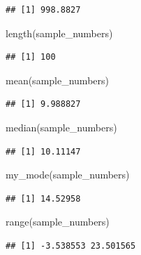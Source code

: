 \documentclass[
]{book}
\newenvironment{Shaded}{\begin{snugshade}}{\end{snugshade}}
\newcommand{\FunctionTok}[1]{\textcolor[rgb]{0.00,0.00,0.00}{#1}}
\newcommand{\NormalTok}[1]{#1}
\begin{document}
\begin{verbatim}
## [1] 998.8827
\end{verbatim}

\begin{Shaded}
\begin{Highlighting}[]
\FunctionTok{length}\NormalTok{(sample\_numbers)}
\end{Highlighting}
\end{Shaded}

\begin{verbatim}
## [1] 100
\end{verbatim}

\begin{Shaded}
\begin{Highlighting}[]
\FunctionTok{mean}\NormalTok{(sample\_numbers)}
\end{Highlighting}
\end{Shaded}

\begin{verbatim}
## [1] 9.988827
\end{verbatim}

\begin{Shaded}
\begin{Highlighting}[]
\FunctionTok{median}\NormalTok{(sample\_numbers)}
\end{Highlighting}
\end{Shaded}

\begin{verbatim}
## [1] 10.11147
\end{verbatim}

\begin{Shaded}
\begin{Highlighting}[]
\FunctionTok{my\_mode}\NormalTok{(sample\_numbers)}
\end{Highlighting}
\end{Shaded}

\begin{verbatim}
## [1] 14.52958
\end{verbatim}

\begin{Shaded}
\begin{Highlighting}[]
\FunctionTok{range}\NormalTok{(sample\_numbers)}
\end{Highlighting}
\end{Shaded}

\begin{verbatim}
## [1] -3.538553 23.501565
\end{verbatim}
\end{document}
